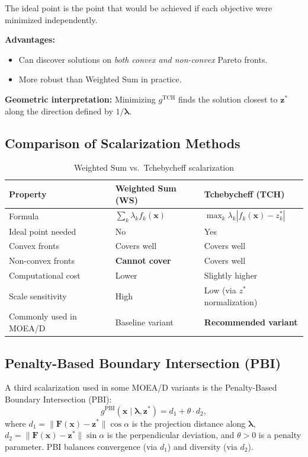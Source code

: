 \documentclass[12pt,a4paper]{article}
\begin{document}
The ideal point is the point that would be achieved if each objective were minimized independently.

\textbf{Advantages:}
\begin{itemize}[leftmargin=1.5cm]
    \item Can discover solutions on \emph{both convex and non-convex} Pareto fronts.
    \item More robust than Weighted Sum in practice.
\end{itemize}

\textbf{Geometric interpretation:} Minimizing $g^{\text{TCH}}$ finds the solution closest to $\mathbf{z}^*$ along the direction defined by $1/\boldsymbol{\lambda}$.

\subsection{Comparison of Scalarization Methods}

\begin{table}[H]
\centering
\caption{Weighted Sum vs.\ Tchebycheff scalarization}
\label{tab:scalar_compare}
\renewcommand{\arraystretch}{1.4}
\begin{tabular}{p{4cm} p{4.5cm} p{4.5cm}}
\toprule
\textbf{Property} & \textbf{Weighted Sum (WS)} & \textbf{Tchebycheff (TCH)} \\
\midrule
Formula & $\sum_k \lambda_k f_k(\mathbf{x})$ & $\max_k \lambda_k |f_k(\mathbf{x}) - z_k^*|$ \\
Ideal point needed & No & Yes \\
Convex fronts & Covers well & Covers well \\
Non-convex fronts & \textbf{Cannot cover} & Covers well \\
Computational cost & Lower & Slightly higher \\
Scale sensitivity & High & Low (via $z^*$ normalization) \\
Commonly used in MOEA/D & Baseline variant & \textbf{Recommended variant} \\
\bottomrule
\end{tabular}
\end{table}

\subsection{Penalty-Based Boundary Intersection (PBI)}

A third scalarization used in some MOEA/D variants is the Penalty-Based Boundary Intersection (PBI):
\begin{equation}
    g^{\text{PBI}}(\mathbf{x} \mid \boldsymbol{\lambda}, \mathbf{z}^*)
    = d_1 + \theta \cdot d_2,
    \label{eq:pbi}
\end{equation}
where $d_1 = \|\mathbf{F}(\mathbf{x}) - \mathbf{z}^*\| \cos\alpha$ is the projection distance along $\boldsymbol{\lambda}$, $d_2 = \|\mathbf{F}(\mathbf{x}) - \mathbf{z}^*\| \sin\alpha$ is the perpendicular deviation, and $\theta > 0$ is a penalty parameter. PBI balances convergence (via $d_1$) and diversity (via $d_2$).
\end{document}
